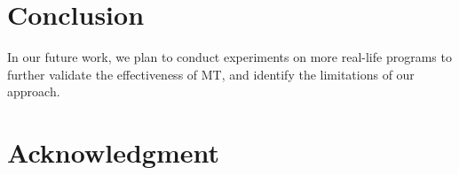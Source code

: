 \documentclass[conference]{IEEEtran}
\begin{document}
\section{Conclusion}
\label{section:conclusion}


In our future work, we plan to conduct experiments on more real-life programs to further validate the effectiveness of MT, and identify the limitations of our approach.

\section*{Acknowledgment}


\newcommand{\BIBdecl}{\setlength{\itemsep}{0.2 em}}



\end{document}
